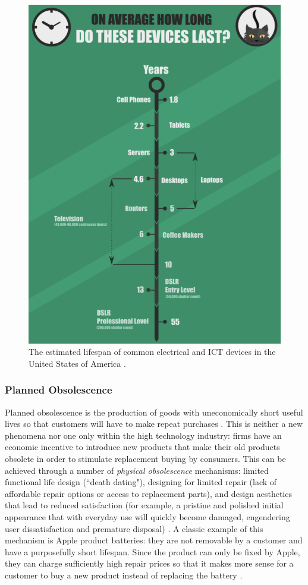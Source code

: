 \documentclass{article}
\begin{document}
\begin{figure}[h]
    \includegraphics[width=.7 \textwidth]{./images/lifespan_ICT_US.png}
    \centering
    \caption{The estimated lifespan of common electrical and ICT devices in the United States of America \cite{webfx2016lifespanICT}.}
    \label{estimated_lifespan_ICT}
\end{figure}


\subsubsection{Planned Obsolescence} \label{SECTION_PLANNED_OBSOLESCCENCE}
Planned obsolescence is the production of goods with uneconomically short useful lives so that customers will have to make repeat purchases
\cite{bulow1986economic}. This is neither a new phenomena nor one only within the high technology industry: firms have an economic incentive to introduce new products that make their old products obsolete in order to stimulate replacement buying by consumers. This can be achieved through a number of \textit{physical obsolescence} mechanisms: limited functional life design (``death dating"), designing for limited repair (lack of affordable repair options or access to replacement parts), and design aesthetics that lead to reduced satisfaction (for example, a pristine and polished initial appearance that with everyday use will quickly become damaged, engendering user dissatisfaction and premature disposal) \cite{guiltinan2009creative}. A classic example of this mechanism is Apple product batteries: they are not removable by a customer and have a purposefully short lifespan. Since the product can only be fixed by Apple, they can charge sufficiently high repair prices so that it makes more sense for a customer to buy a new product instead of replacing the battery \cite{keeble2013culture}.
\end{document}
